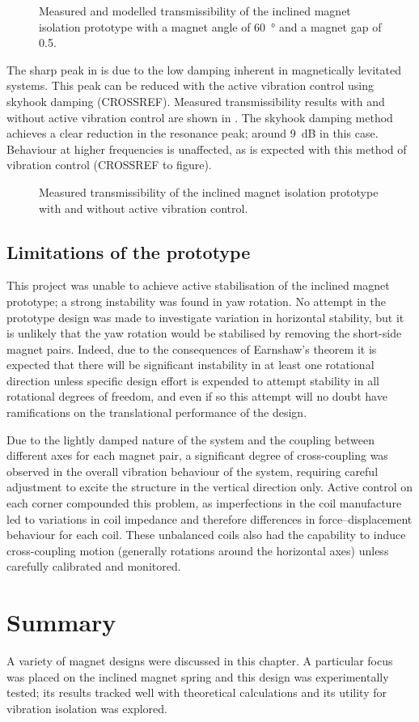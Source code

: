 \documentclass[11pt,a4paper]{memoir}
\begin{document}
\begin{figure}
\centering
{}
\caption{Measured and modelled transmissibility of the inclined magnet isolation prototype with a magnet angle of \SI{60}{\degree} and a magnet gap of \num{0.5}.}
\end{figure}

The sharp peak in  is due to the low damping inherent in magnetically levitated systems.
This peak can be reduced with the active vibration control using skyhook damping (CROSSREF).
Measured transmissibility results with and without active vibration control are shown in .
The skyhook damping method achieves a clear reduction in the resonance peak; around \SI{9}{dB} in this case.
Behaviour at higher frequencies is unaffected, as is expected with this method of vibration control (CROSSREF to figure).

\begin{figure}
\centering
{}
\caption{Measured transmissibility of the inclined magnet isolation prototype with and without active vibration control.}
\end{figure}

\subsection{Limitations of the prototype}

This project was unable to achieve active stabilisation of the inclined magnet prototype; a strong instability was found in yaw rotation.
No attempt in the prototype design was made to investigate variation in horizontal stability, but it is unlikely that the yaw rotation would be stabilised by removing the short-side magnet pairs.
Indeed, due to the consequences of Earnshaw's theorem it is expected that there will be significant instability in at least one rotational direction unless specific design effort is expended to attempt stability in all rotational degrees of freedom, and even if so this attempt will no doubt have ramifications on the translational performance of the design.

Due to the lightly damped nature of the system and the coupling between different axes for each magnet pair, a significant degree of cross-coupling was observed in the overall vibration behaviour of the system, requiring careful adjustment to excite the structure in the vertical direction only.
Active control on each corner compounded this problem, as imperfections in the coil manufacture led to variations in coil impedance and therefore differences in force--displacement behaviour for each coil.
These unbalanced coils also had the capability to induce cross-coupling motion (generally rotations around the horizontal axes) unless carefully calibrated and monitored.

\section{Summary}

A variety of magnet designs were discussed in this chapter.
A particular focus was placed on the inclined magnet spring and this design was experimentally tested; its results tracked well with theoretical calculations and its utility for vibration isolation was explored.
\end{document}
